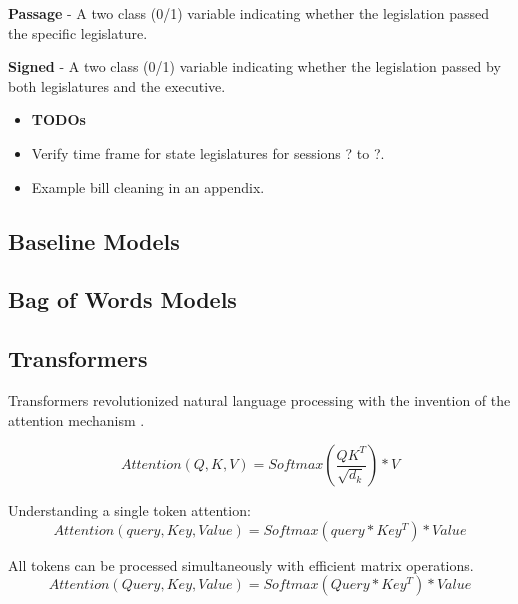 \documentclass[11pt]{article}
\begin{document}
\textbf{Passage} - A two class (0/1) variable indicating whether the legislation passed the specific legislature. 

\textbf{Signed} - A two class (0/1) variable indicating whether the legislation passed by both legislatures and the executive.


\begin{itemize}
  \item \textbf{TODOs}
  \item Verify time frame for state legislatures for sessions ? to ?.
  \item Example bill cleaning in an appendix.

\end{itemize}

\subsection{Baseline Models}

\subsection{Bag of Words Models}

\subsection{Transformers}


Transformers revolutionized natural language processing with the invention of the attention mechanism \cite{attentionisallyouneed}.

\begin{equation}
Attention(Q,K,V) = Softmax(\frac{QK^T}{\sqrt{d_k}}) * V
\end{equation}


Understanding a single token attention:
\begin{equation}
Attention(query, Key, Value) = Softmax(query * Key^T) * Value
\end{equation}

All tokens can be processed simultaneously with efficient matrix operations.
\begin{equation}
Attention(Query, Key, Value) = Softmax(Query * Key^T) * Value 
\end{equation}
\end{document}
